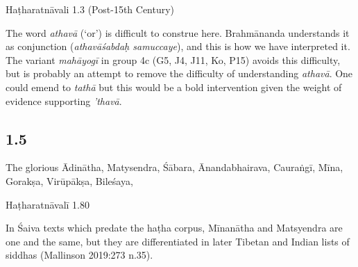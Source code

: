 \begin{ekdosis}
\begin{testimonia}[hp01_004]
Haṭharatnāvali 1.3 (Post-15th Century)

\begin{versinnote}
\end{versinnote}

\end{testimonia}

\begin{philcomm}[hp01_004]   
The word \emph{athavā} (‘or’) is difficult to construe here. Brahmānanda understands it as conjunction (\emph{athavāśabdaḥ samuccaye}), and this is how we have interpreted it. The variant \emph{mahāyogī} in group 4c (G5, J4, J11, Ko, P15) avoids this difficulty, but is probably an attempt to remove the difficulty of understanding \emph{athavā}. One could emend to \emph{tathā} but this would be a bold intervention given the weight of evidence supporting \emph{’thavā}.   
\end{philcomm}

\subsection*{1.5}
\begin{translation}[hp01_005]
The glorious Ādinātha, Matysendra, Śābara, Ānandabhairava, Cauraṅgī, Mīna, Gorakṣa, Virūpākṣa, Bileśaya,
\end{translation}

\begin{testimonia}[hp01_005]
Haṭharatnāvalī 1.80

\begin{versinnote}
\end{versinnote}

\end{testimonia}

\begin{philcomm}[hp01_005]     
In Śaiva texts which predate the haṭha corpus, Mīnanātha and Matsyendra are one and the same, but they are differentiated in later Tibetan and Indian lists of siddhas (Mallinson 2019:273 n.35).   
\end{philcomm}


\end{ekdosis}
